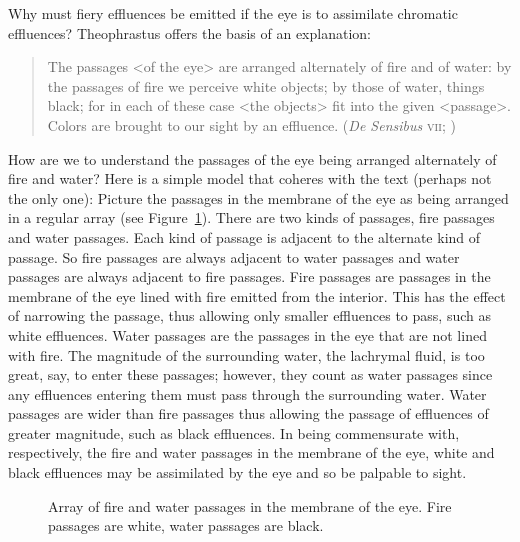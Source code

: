 Why must fiery effluences be emitted if the eye is to assimilate chromatic effluences? Theophrastus offers the basis of an explanation:
\begin{quote}
	The passages <of the eye> are arranged alternately of fire and of water: by the passages of fire we perceive white objects; by those of water, things black; for in each of these case <the objects> fit into the given <passage>. Colors are brought to our sight by an effluence. (\emph{De Sensibus} \textsc{vii}; \citealt[71--73]{Stratton:1917vn})
\end{quote}
How are we to understand the passages of the eye being arranged alternately of fire and water? Here is a simple model that coheres with the text (perhaps not the only one): Picture the passages in the membrane of the eye as being arranged in a regular array (see Figure~\ref{fig:1}). There are two kinds of passages, fire passages and water passages. Each kind of passage is adjacent to the alternate kind of passage. So fire passages are always adjacent to water passages and water passages are always adjacent to fire passages. Fire passages are passages in the membrane of the eye lined with fire emitted from the interior. This has the effect of narrowing the passage, thus allowing only smaller effluences to pass, such as white effluences. Water passages are the passages in the eye that are not lined with fire. The magnitude of the surrounding water, the lachrymal fluid, is too great, say, to enter these passages; however, they count as water passages since any effluences entering them must pass through the surrounding water. Water passages are wider than fire passages thus allowing the passage of effluences of greater magnitude, such as black effluences. In being commensurate with, respectively, the fire and water passages in the membrane of the eye, white and black effluences may be assimilated by the eye and so be palpable to sight. 

\begin{figure}[ht]
    \begin{center}
    \end{center}
    \caption{Array of fire and water passages in the membrane of the eye. Fire passages are white, water passages are black.}
    \label{fig:1}
\end{figure}

